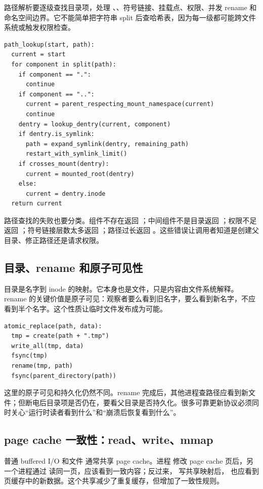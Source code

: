 路径解析要逐级查找目录项，处理 、、符号链接、挂载点、权限、并发 rename 和命名空间边界。它不能简单把字符串 split 后查哈希表，因为每一级都可能跨文件系统或触发权限检查。

\begin{lstlisting}
path_lookup(start, path):
  current = start
  for component in split(path):
    if component == ".":
      continue
    if component == "..":
      current = parent_respecting_mount_namespace(current)
      continue
    dentry = lookup_dentry(current, component)
    if dentry.is_symlink:
      path = expand_symlink(dentry, remaining_path)
      restart_with_symlink_limit()
    if crosses_mount(dentry):
      current = mounted_root(dentry)
    else:
      current = dentry.inode
  return current
\end{lstlisting}

路径查找的失败也要分类。组件不存在返回 ；中间组件不是目录返回 ；权限不足返回 ；符号链接层数太多返回 ；路径过长返回 。这些错误让调用者知道是创建父目录、修正路径还是请求权限。

\subsection{目录、rename 和原子可见性}

目录是名字到 inode 的映射。它本身也是文件，只是内容由文件系统解释。rename 的关键价值是原子可见：观察者要么看到旧名字，要么看到新名字，不应看到半个名字。这个性质让临时文件发布成为可能。

\begin{lstlisting}
atomic_replace(path, data):
  tmp = create(path + ".tmp")
  write_all(tmp, data)
  fsync(tmp)
  rename(tmp, path)
  fsync(parent_directory(path))
\end{lstlisting}

这里的原子可见和持久化仍然不同。rename 完成后，其他进程查路径应看到新文件；但断电后目录项是否仍在，要看父目录是否持久化。很多可靠更新协议必须同时关心“运行时读者看到什么”和“崩溃后恢复看到什么”。

\subsection{page cache 一致性：read、write、mmap}

普通 buffered I/O 和文件  通常共享 page cache。进程  修改 page cache 页后，另一个进程通过  读同一页，应该看到一致内容；反过来， 写共享映射后， 也应看到页缓存中的新数据。这个共享减少了重复缓存，但增加了一致性规则。

